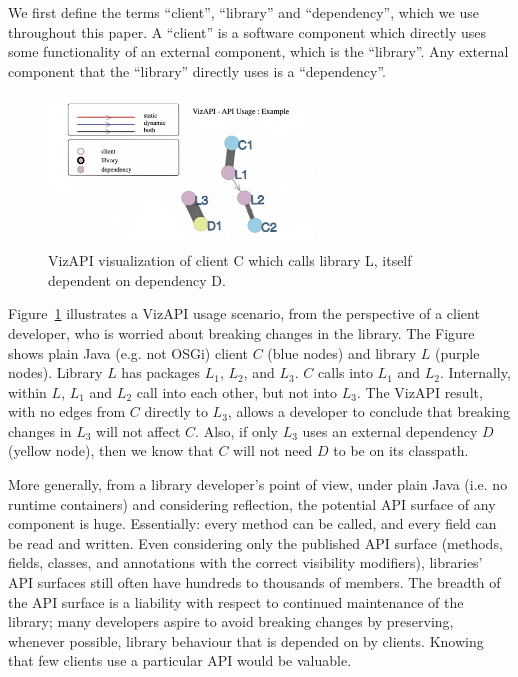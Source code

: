 We first define the terms ``client'', ``library'' and ``dependency'', which we use throughout this paper. A ``client'' is a software component which directly uses some functionality of an external component, which is the ``library''. Any external component that the ``library'' directly uses is a ``dependency''. 

\begin{figure}[h]
\begin{center}
\includegraphics[height=4cm,width=7cm]{images/intro-example.png}
\caption{VizAPI visualization of client C which calls library L, itself dependent on dependency D.}
\label{fig:example}
\end{center}
\end{figure}

Figure~\ref{fig:example} illustrates a VizAPI usage scenario, from the perspective of a client developer, who is worried about breaking changes in the library. The Figure shows plain Java (e.g. not OSGi) client $C$ (blue nodes) and library $L$ (purple nodes). Library $L$ has packages $L_1$, $L_2$, and $L_3$. $C$ calls into $L_1$ and $L_2$. Internally, within $L$, $L_1$ and $L_2$ call into each other, but not into $L_3$. The VizAPI result, with no edges from $C$ directly to $L_3$, allows a developer to conclude that breaking changes in $L_3$ will not affect $C$. Also, if only $L_3$ uses an external dependency $D$ (yellow node), then we know that $C$ will not need $D$ to be on its classpath.

More generally, from a library developer's point of view, under plain Java (i.e. no runtime containers) and considering reflection, the potential API surface of any component is huge. Essentially: every method can be called, and every field can be read and written. Even considering only the published API surface (methods, fields, classes, and annotations with the correct visibility modifiers), libraries' API surfaces still often have hundreds to thousands of members. The breadth of the API surface is a liability with respect to continued maintenance of the library; many developers aspire to avoid breaking changes by preserving, whenever possible, library behaviour that is depended on by clients. Knowing that few clients use a particular API would be valuable.

